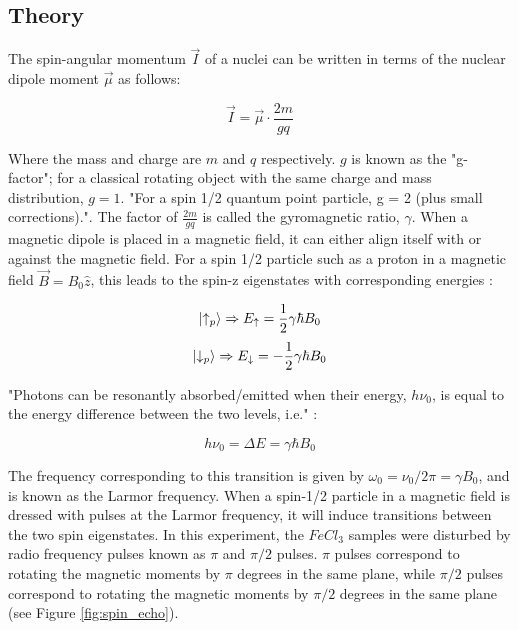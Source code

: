 \documentclass[a4paper, 12pt]{article}  %
\begin{document}



\subsection{Theory}\label{Theory}
The spin-angular momentum $\Vec{I}$ of a nuclei can be written in terms of the nuclear dipole moment $\Vec{\mu}$ as follows:

\begin{equation}\label{angular momentum}
    \Vec{I} = \Vec{\mu} \cdot \frac{2m}{g q}
\end{equation}

Where the mass and charge are $m$ and $q$ respectively. $g$ is known as the "g-factor"; for a classical rotating object with the same charge and mass distribution, $g = 1$. "For a spin 1/2 quantum point particle, g = 2 (plus small corrections)."\cite{Lab Manual}. The factor of $\frac{2m}{g q}$ is called the gyromagnetic ratio, $\gamma$. When a magnetic dipole is placed in a magnetic field, it can either align itself with or against the magnetic field. For a spin 1/2 particle such as a proton in a magnetic field $\Vec{B} = B_0 \hat{z}$, this leads to the spin-z eigenstates with corresponding energies \cite{Lab Manual}:

\begin{equation*}\label{spin eigenstates}
\ket{\uparrow_p} \Rightarrow E_{\uparrow} = \frac{1}{2} \gamma \hbar B_0 
\end{equation*}
\begin{equation*}
    \ket{\downarrow_p} \Rightarrow E_{\downarrow} = -\frac{1}{2} \gamma \hbar B_0 
\end{equation*}

"Photons can be resonantly absorbed/emitted when their energy, $h \nu_0$, is equal to the energy difference between the two levels, i.e." \cite{Lab Manual}:

\begin{equation*}
    h \nu_0 = \Delta E = \gamma \hbar B_0
\end{equation*}

The frequency corresponding to this transition is given by $\omega_0 = \nu_0 / 2\pi = \gamma B_0$, and is known as the Larmor frequency. When a spin-1/2 particle in a magnetic field is dressed with pulses at the Larmor frequency, it will induce transitions between the two spin eigenstates. In this experiment, the $FeCl_3$ samples were disturbed by radio frequency pulses known as $\pi$ and $\pi/2$ pulses. $\pi$ pulses correspond to rotating the magnetic moments by $\pi$ degrees in the same plane, while $\pi/2$ pulses correspond to rotating the magnetic moments by $\pi/2$ degrees in the same plane (see Figure \ref{fig:spin_echo}). 
\newline
\end{document}
